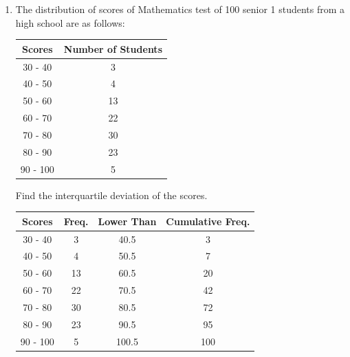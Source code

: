 \documentclass{report}
\begin{document}
\begin{multicols}{2}
\begin{enumerate}
    \item The distribution of scores of Mathematics test of 100 senior 1 students from a
          high school are as follows:
          \begin{center}
            \begin{tabular}{|c|c|}
              \hline
              Scores   & Number of Students \\
              \hline
              30 - 40  & 3                  \\
              40 - 50  & 4                  \\
              50 - 60  & 13                 \\
              60 - 70  & 22                 \\
              70 - 80  & 30                 \\
              80 - 90  & 23                 \\
              90 - 100 & 5                  \\
              \hline
            \end{tabular}
          \end{center}
          Find the interquartile deviation of the scores.
          \sol{}
          \begin{center}
            \begin{tabular}{|c|c|c|c|}
              \hline
              Scores   & Freq. & Lower Than & Cumulative Freq. \\
              \hline
              30 - 40  & 3     & 40.5       & 3                \\
              40 - 50  & 4     & 50.5       & 7                \\
              50 - 60  & 13    & 60.5       & 20               \\
              60 - 70  & 22    & 70.5       & 42               \\
              70 - 80  & 30    & 80.5       & 72               \\
              80 - 90  & 23    & 90.5       & 95               \\
              90 - 100 & 5     & 100.5      & 100              \\
              \hline
            \end{tabular}
          \end{center}


\end{enumerate}
\end{multicols}
\end{document}

